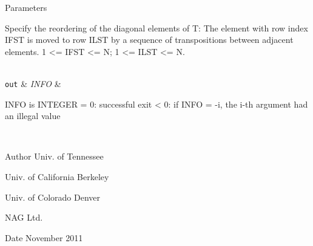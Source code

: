 \begin{DoxyParams}[1]{Parameters}
\begin{DoxyVerb}
          Specify the reordering of the diagonal elements of T:
          The element with row index IFST is moved to row ILST by a
          sequence of transpositions between adjacent elements.
          1 <= IFST <= N; 1 <= ILST <= N.\end{DoxyVerb}
\\
\hline
\mbox{\tt out}  & {\em I\+N\+F\+O} & \begin{DoxyVerb}          INFO is INTEGER
          = 0:  successful exit
          < 0:  if INFO = -i, the i-th argument had an illegal value\end{DoxyVerb}
 \\
\hline
\end{DoxyParams}
\begin{DoxyAuthor}{Author}
Univ. of Tennessee 

Univ. of California Berkeley 

Univ. of Colorado Denver 

N\+A\+G Ltd. 
\end{DoxyAuthor}
\begin{DoxyDate}{Date}
November 2011 
\end{DoxyDate}
